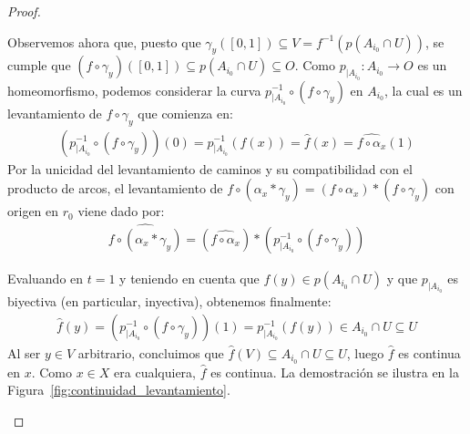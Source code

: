 \begin{teo}
\begin{proof}
\begin{description}
            Observemos ahora que, puesto que $\gamma_y([0,1]) \subseteq V = f^{-1}(p(A_{i_0}\cap U))$, se cumple que $(f \circ \gamma_y)([0,1]) \subseteq p(A_{i_0}\cap U) \subseteq O$. Como $p_{|A_{i_0}} : A_{i_0} \to O$ es un homeomorfismo, podemos considerar la curva $p_{|A_{i_0}}^{-1} \circ (f \circ \gamma_y)$ en $A_{i_0}$, la cual es un levantamiento de $f \circ \gamma_y$ que comienza en:
            \begin{gather*}
                \left(p_{|A_{i_0}}^{-1} \circ (f \circ \gamma_y)\right)(0) = p_{|A_{i_0}}^{-1}(f(x)) = \hat{f}(x) = \widehat{f \circ \alpha_x}(1)
            \end{gather*}
            Por la unicidad del levantamiento de caminos y su compatibilidad con el producto de arcos, el levantamiento de $f \circ (\alpha_x \ast \gamma_y) = (f \circ \alpha_x) \ast (f \circ \gamma_y)$ con origen en $r_0$ viene dado por:
            \begin{gather*}
                \widehat{f \circ (\alpha_x \ast \gamma_y)} = (\widehat{f \circ \alpha_x}) \ast \left(p_{|A_{i_0}}^{-1} \circ (f \circ \gamma_y)\right)
            \end{gather*}

            Evaluando en $t=1$ y teniendo en cuenta que $f(y) \in p(A_{i_0}\cap U)$ y que $p_{|A_{i_0}}$ es biyectiva (en particular, inyectiva), obtenemos finalmente:
            \begin{gather*}
                \hat{f}(y) = \left(p_{|A_{i_0}}^{-1} \circ (f \circ \gamma_y)\right)(1) = p_{|A_{i_0}}^{-1}(f(y)) \in A_{i_0} \cap U \subseteq U
            \end{gather*}
            Al ser $y \in V$ arbitrario, concluimos que $\hat{f}(V) \subseteq A_{i_0} \cap U \subseteq U$, luego $\hat{f}$ es continua en $x$. Como $x \in X$ era cualquiera, $\hat{f}$ es continua. La demostración se ilustra en la Figura~\ref{fig:continuidad_levantamiento}.


            \begin{figure}[ht]
                \centering
\end{figure}
\end{description}
\end{proof}
\end{teo}
